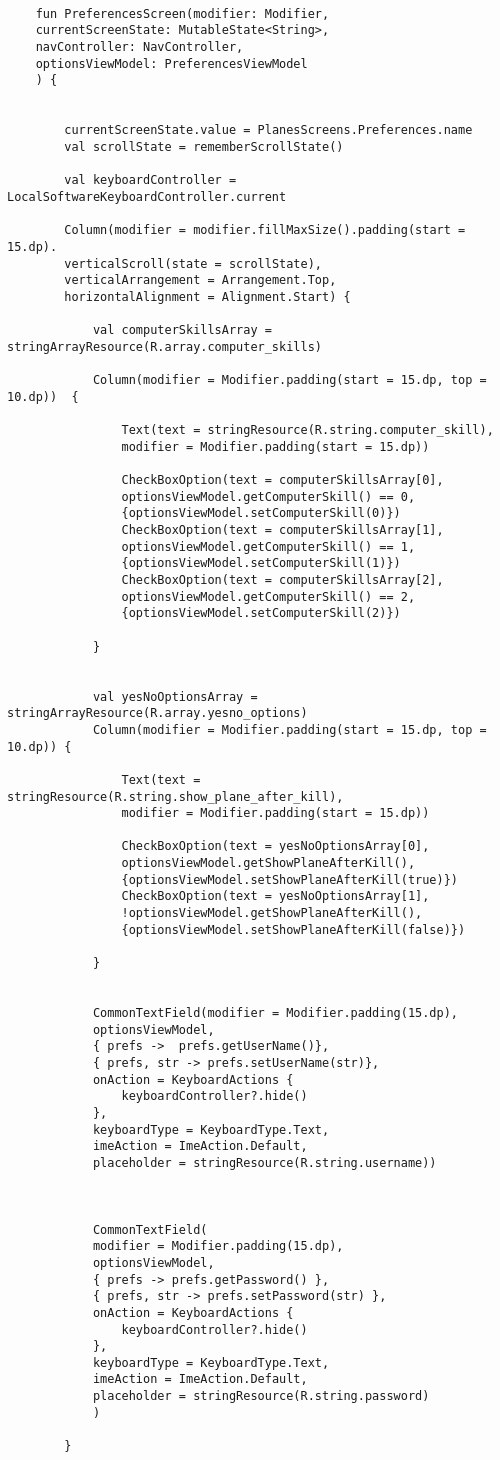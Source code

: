 \begin{lstlisting}
	
	fun PreferencesScreen(modifier: Modifier,
	currentScreenState: MutableState<String>,
	navController: NavController,
	optionsViewModel: PreferencesViewModel
	) {
		
		
		currentScreenState.value = PlanesScreens.Preferences.name
		val scrollState = rememberScrollState()
		
		val keyboardController = LocalSoftwareKeyboardController.current
		
		Column(modifier = modifier.fillMaxSize().padding(start = 15.dp).
		verticalScroll(state = scrollState),
		verticalArrangement = Arrangement.Top,
		horizontalAlignment = Alignment.Start) {
			
			val computerSkillsArray = stringArrayResource(R.array.computer_skills)
			
			Column(modifier = Modifier.padding(start = 15.dp, top = 10.dp))  {
				
				Text(text = stringResource(R.string.computer_skill),
				modifier = Modifier.padding(start = 15.dp))
				
				CheckBoxOption(text = computerSkillsArray[0],
				optionsViewModel.getComputerSkill() == 0,
				{optionsViewModel.setComputerSkill(0)})
				CheckBoxOption(text = computerSkillsArray[1],
				optionsViewModel.getComputerSkill() == 1,
				{optionsViewModel.setComputerSkill(1)})
				CheckBoxOption(text = computerSkillsArray[2],
				optionsViewModel.getComputerSkill() == 2,
				{optionsViewModel.setComputerSkill(2)})
				
			}
			
			
			val yesNoOptionsArray = stringArrayResource(R.array.yesno_options)
			Column(modifier = Modifier.padding(start = 15.dp, top = 10.dp)) {
				
				Text(text = stringResource(R.string.show_plane_after_kill),
				modifier = Modifier.padding(start = 15.dp))
				
				CheckBoxOption(text = yesNoOptionsArray[0],
				optionsViewModel.getShowPlaneAfterKill(),
				{optionsViewModel.setShowPlaneAfterKill(true)})
				CheckBoxOption(text = yesNoOptionsArray[1],
				!optionsViewModel.getShowPlaneAfterKill(),
				{optionsViewModel.setShowPlaneAfterKill(false)})
				
			}
			
			
			CommonTextField(modifier = Modifier.padding(15.dp),
			optionsViewModel,
			{ prefs ->  prefs.getUserName()},
			{ prefs, str -> prefs.setUserName(str)},
			onAction = KeyboardActions {
				keyboardController?.hide()
			},
			keyboardType = KeyboardType.Text,
			imeAction = ImeAction.Default,
			placeholder = stringResource(R.string.username))
			
			
			
			CommonTextField(
			modifier = Modifier.padding(15.dp),
			optionsViewModel,
			{ prefs -> prefs.getPassword() },
			{ prefs, str -> prefs.setPassword(str) },
			onAction = KeyboardActions {
				keyboardController?.hide()
			},
			keyboardType = KeyboardType.Text,
			imeAction = ImeAction.Default,
			placeholder = stringResource(R.string.password)
			)
			
		}
\end{lstlisting}

